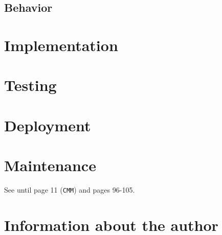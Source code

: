 \documentclass{llncs}
\newcommand{\labelsec}[1]{\label{sec:#1}}
\begin{document}
\subsection{Behavior}

\section{Implementation}
\labelsec{Implementation}

\section{Testing}
\labelsec{testing}

\section{Deployment}
\labelsec{Deployment}

\section{Maintenance}
\labelsec{Maintenance}
\newpage
See \cite{natMol09} until page 11 (\texttt{CMM}) and pages 96-105.

\section{Information about the author}
\labelsec{Author}
\end{document}
